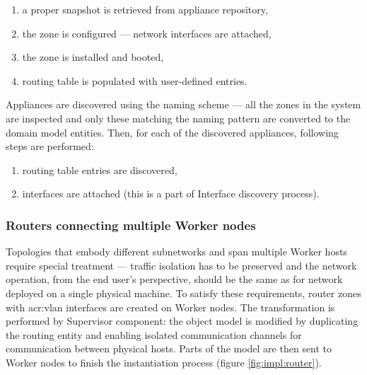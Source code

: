 \documentclass[11pt]{book}
\begin{document}
          \begin{enumerate}
            \item a proper snapshot is retrieved from appliance repository,
            \item the zone is configured --- network interfaces are attached,
            \item the zone is installed and booted,
            \item routing table is populated with user-defined entries.
          \end{enumerate}

          Appliances are discovered using the naming scheme --- all the zones in the system are inspected and only these
          matching the naming pattern are converted to the domain model entities. Then, for each of the discovered
          appliances, following steps are performed:

          \begin{enumerate}
            \item routing table entries are discovered,
            \item interfaces are attached (this is a part of Interface discovery process).
          \end{enumerate}


        \subsubsection{Routers connecting multiple Worker nodes}

          Topologies that embody different subnetworks and span multiple Worker hosts require special treatment ---
          traffic isolation has to be preserved and the network operation, from the end user's perspective, should be
          the same as for network deployed on a single physical machine. To satisfy these requirements, router zones
          with \gls{acr:vlan} interfaces are created on Worker nodes. The transformation is performed by Supervisor
          component: the object model is modified by duplicating the routing entity and enabling isolated communication
          channels for communication between physical hosts. Parts of the model are then sent to Worker nodes to finish
          the instantiation process (figure \ref{fig:impl:router}).
\end{document}
